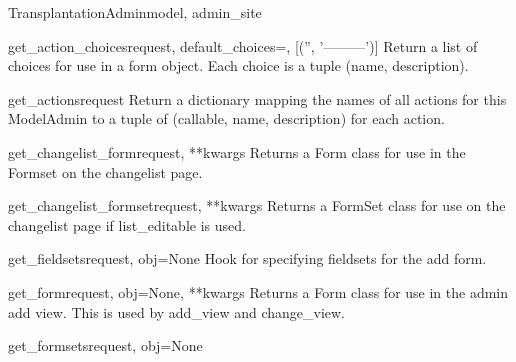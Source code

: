 \documentclass[letterpaper,10pt,english]{sphinxmanual}
\begin{document}
\begin{classdesc}{TransplantationAdmin}{model, admin\_site}
\hypertarget{data.admin.TransplantationAdmin.get_action_choices}{}\begin{methoddesc}{get\_action\_choices}{request, default\_choices=, {[}('', '---------'){]}}
Return a list of choices for use in a form object.  Each choice is a
tuple (name, description).
\end{methoddesc}

\hypertarget{data.admin.TransplantationAdmin.get_actions}{}\begin{methoddesc}{get\_actions}{request}
Return a dictionary mapping the names of all actions for this
ModelAdmin to a tuple of (callable, name, description) for each action.
\end{methoddesc}

\hypertarget{data.admin.TransplantationAdmin.get_changelist_form}{}\begin{methoddesc}{get\_changelist\_form}{request, **kwargs}
Returns a Form class for use in the Formset on the changelist page.
\end{methoddesc}

\hypertarget{data.admin.TransplantationAdmin.get_changelist_formset}{}\begin{methoddesc}{get\_changelist\_formset}{request, **kwargs}
Returns a FormSet class for use on the changelist page if list\_editable
is used.
\end{methoddesc}

\hypertarget{data.admin.TransplantationAdmin.get_fieldsets}{}\begin{methoddesc}{get\_fieldsets}{request, obj=None}
Hook for specifying fieldsets for the add form.
\end{methoddesc}

\hypertarget{data.admin.TransplantationAdmin.get_form}{}\begin{methoddesc}{get\_form}{request, obj=None, **kwargs}
Returns a Form class for use in the admin add view. This is used by
add\_view and change\_view.
\end{methoddesc}

\hypertarget{data.admin.TransplantationAdmin.get_formsets}{}\begin{methoddesc}{get\_formsets}{request, obj=None}\end{methoddesc}


\end{classdesc}
\end{document}
